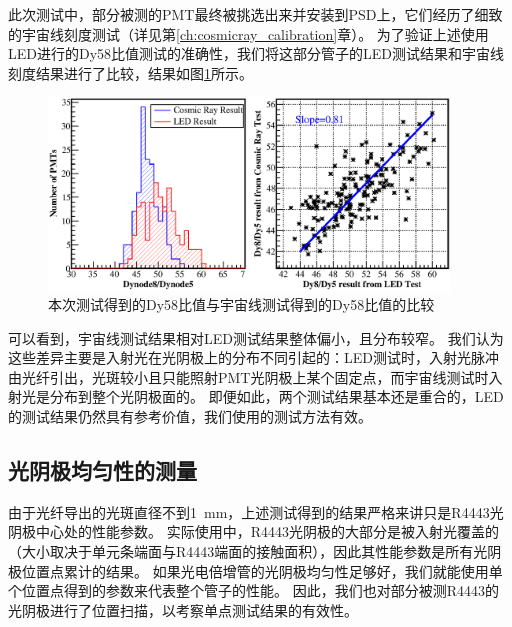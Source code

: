 此次测试中，部分被测的PMT最终被挑选出来并安装到PSD上，它们经历了细致的宇宙线刻度测试（详见第\ref{ch:cosmicray_calibration}章）。
为了验证上述使用LED进行的Dy58比值测试的准确性，我们将这部分管子的LED测试结果和宇宙线刻度结果进行了比较，结果如图\ref{fig:pmt_test:dy58_ledvscm}所示。
\begin{figure}[htbp]
	\centering
	\includegraphics[width=0.95\textwidth]{chap/pmt_test/fig/dy58_ledvscm.eps}
	\caption{本次测试得到的Dy58比值与宇宙线测试得到的Dy58比值的比较}
	\label{fig:pmt_test:dy58_ledvscm}
\end{figure}
可以看到，宇宙线测试结果相对LED测试结果整体偏小，且分布较窄。
我们认为这些差异主要是入射光在光阴极上的分布不同引起的：LED测试时，入射光脉冲由光纤引出，光斑较小且只能照射PMT光阴极上某个固定点，而宇宙线测试时入射光是分布到整个光阴极面的。
即便如此，两个测试结果基本还是重合的，LED的测试结果仍然具有参考价值，我们使用的测试方法有效。

\subsection{光阴极均匀性的测量}
\label{sec:pmt_test:cathode_scanning}
由于光纤导出的光斑直径不到\SI{1}{mm}，上述测试得到的结果严格来讲只是R4443光阴极中心处的性能参数。
实际使用中，R4443光阴极的大部分是被入射光覆盖的（大小取决于单元条端面与R4443端面的接触面积），因此其性能参数是所有光阴极位置点累计的结果。
如果光电倍增管的光阴极均匀性足够好，我们就能使用单个位置点得到的参数来代表整个管子的性能。
因此，我们也对部分被测R4443的光阴极进行了位置扫描，以考察单点测试结果的有效性。

